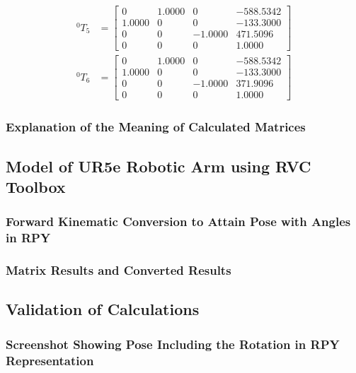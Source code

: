 \begin{equation*}
\begin{split}
        ^{0}T_{5} & = \begin{bmatrix}
                          0      & 1.0000 & 0       & -588.5342 \\
                          1.0000 & 0      & 0       & -133.3000 \\
                          0      & 0      & -1.0000 & 471.5096  \\
                          0      & 0      & 0       & 1.0000
                      \end{bmatrix}    \\
        ^{0}T_{6} & = \begin{bmatrix}
                          0      & 1.0000 & 0       & -588.5342 \\
                          1.0000 & 0      & 0       & -133.3000 \\
                          0      & 0      & -1.0000 & 371.9096  \\
                          0      & 0      & 0       & 1.0000
                      \end{bmatrix}
    \end{split}
\end{equation*}
\subsubsection{Explanation of the Meaning of Calculated Matrices}



\subsection{Model of UR5e Robotic Arm using RVC Toolbox}
\subsubsection{Forward Kinematic Conversion to Attain Pose with Angles in RPY}
\subsubsection{Matrix Results and Converted Results}
\subsection{Validation of Calculations}
\subsubsection{Screenshot Showing Pose Including the Rotation in RPY Representation}
